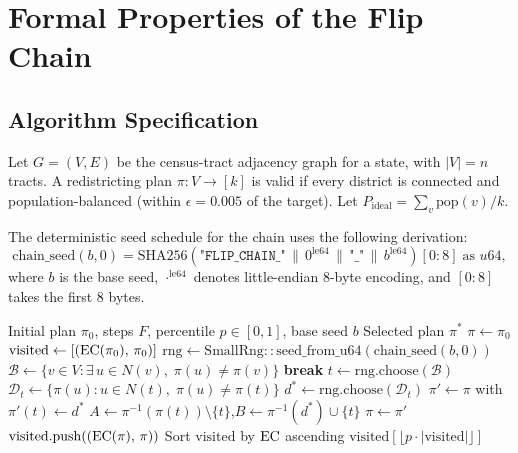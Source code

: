 \section{Formal Properties of the Flip Chain}
\label{sec:formal}

\subsection{Algorithm Specification}

Let $G = (V, E)$ be the census-tract adjacency graph for a state, with
$|V| = n$ tracts.
A redistricting plan $\pi : V \to [k]$ is valid if every district is
connected and population-balanced (within $\epsilon = 0.005$ of the target).
Let $P_{\mathrm{ideal}} = \sum_{v} \mathrm{pop}(v) / k$.

The deterministic seed schedule for the \flip{} chain uses the following
derivation:
\[
  \mathrm{chain\_seed}(b, 0)
  = \mathrm{SHA256}\!\left(\texttt{"FLIP\_CHAIN\_"} \,\|\, 0^{\mathrm{le64}}
    \,\|\, \texttt{"\_"} \,\|\, b^{\mathrm{le64}}\right)[0{:}8]
    \;\text{as } u64,
\]
where $b$ is the base seed, $\cdot^{\mathrm{le64}}$ denotes little-endian
8-byte encoding, and $[0{:}8]$ takes the first 8 bytes.

\begin{algorithm}
\caption{\flip{} Chain}
\label{alg:flip}
\begin{algorithmic}[1]
\Require Initial plan $\pi_0$, steps $F$, percentile $p \in [0,1]$,
         base seed $b$
\Ensure  Selected plan $\pi^*$
\State $\pi \gets \pi_0$
\State $\mathrm{visited} \gets [(\mathrm{EC}(\pi_0),\, \pi_0)]$
\State $\mathrm{rng} \gets \mathrm{SmallRng::seed\_from\_u64}(\mathrm{chain\_seed}(b, 0))$
  \State $\mathcal{B} \gets \{v \in V : \exists\, u \in N(v),\; \pi(u) \neq \pi(v)\}$
   \textbf{break} \EndIf
  \State $t \gets \mathrm{rng.choose}(\mathcal{B})$
  \State $\mathcal{D}_t \gets \{\pi(u) : u \in N(t),\; \pi(u) \neq \pi(t)\}$
  \State $d^* \gets \mathrm{rng.choose}(\mathcal{D}_t)$
  \State $\pi' \gets \pi$ with $\pi'(t) \gets d^*$
  \State $A \gets \pi^{-1}(\pi(t)) \setminus \{t\}$,\quad $B \gets \pi^{-1}(d^*) \cup \{t\}$
    \State $\pi \gets \pi'$
    \State $\mathrm{visited}.\mathrm{push}((\mathrm{EC}(\pi),\, \pi))$
  \EndIf
\EndFor
\State Sort $\mathrm{visited}$ by $\mathrm{EC}$ ascending
\State \Return $\mathrm{visited}[\lfloor p \cdot |\mathrm{visited}|\rfloor]$
\end{algorithmic}
\end{algorithm}

